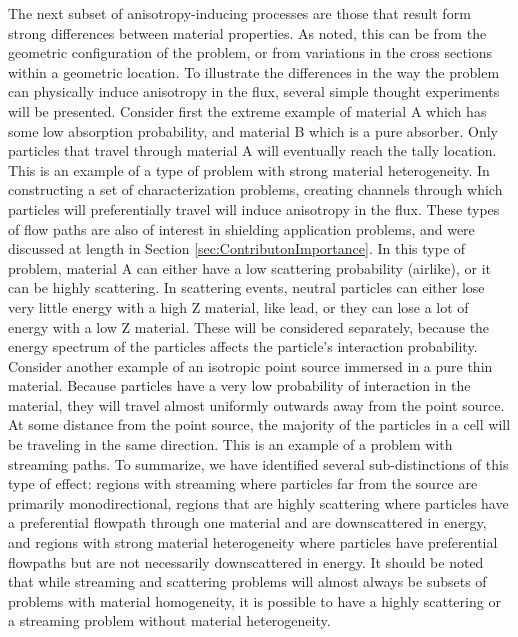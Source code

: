 The next subset of anisotropy-inducing processes are those that result form
strong differences between material properties. As noted, this can be from
the geometric configuration of the problem, or from variations in the cross
sections within a geometric location. To illustrate the differences in the way
the problem can physically induce anisotropy in the flux, several simple thought
experiments will be presented. Consider first the extreme example of material
A which has some low absorption probability,
and material B which is a pure absorber. Only
particles that travel through material A will eventually reach the tally
location. This is an example of a type of problem with strong material
heterogeneity. In constructing a set of characterization problems, creating channels
through which particles will preferentially travel will induce anisotropy in the
flux. These types of flow paths are also of interest in shielding application
problems, and were discussed at length in Section
\ref{sec:ContributonImportance}. In this type of problem, material A can either
have a low scattering probability (airlike), or it can be highly scattering. In
scattering events, neutral particles can either lose very little energy with a high Z
material, like lead, or they can lose a lot of energy with a low Z material.
These will be considered separately, because the energy spectrum of the
particles affects the particle's interaction probability.
Consider another example of an isotropic
point source immersed in a pure thin material. Because particles have a very low
probability of interaction in the material, they will travel almost uniformly
outwards away from the point source. At some distance from the point source, the
majority of the
particles in a cell will be traveling in the same direction. This is an example
of a problem with streaming paths.
To summarize, we have identified several
sub-distinctions of this type of effect: regions with streaming where particles
far from the source are primarily monodirectional, regions
that are highly scattering where particles have a preferential flowpath through
one material and are downscattered in energy, and regions with strong
material heterogeneity where particles have preferential flowpaths but are not
necessarily downscattered in energy. It should be noted that while streaming and
scattering problems will almost always be subsets of problems with material
homogeneity, it is possible to have a highly scattering or a streaming problem
without material heterogeneity.

